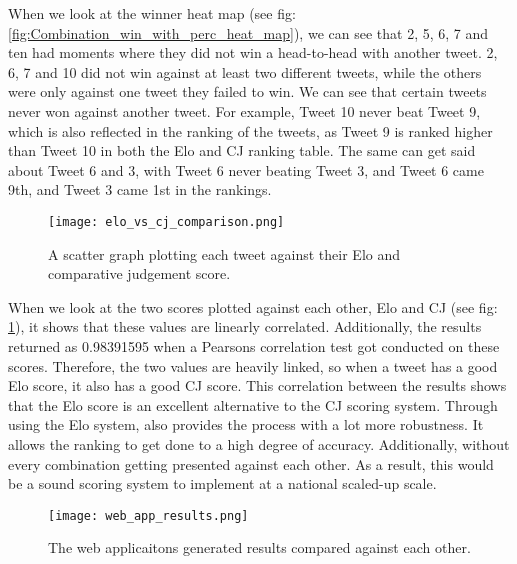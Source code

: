 	When we look at the winner heat map (see fig: \ref{fig:Combination_win_with_perc_heat_map}), we can see that 2, 5, 6, 7 and ten had moments where they did not win a head-to-head with another tweet. 2, 6, 7 and 10 did not win against at least two different tweets, while the others were only against one tweet they failed to win. We can see that certain tweets never won against another tweet. For example, Tweet 10 never beat Tweet 9, which is also reflected in the ranking of the tweets, as Tweet 9 is ranked higher than Tweet 10 in both the Elo and CJ ranking table. The same can get said about Tweet 6 and 3, with Tweet 6 never beating Tweet 3, and Tweet 6 came 9th, and Tweet 3 came 1st in the rankings.
	
	\begin{figure}[h]
		\centering
		\texttt{[image: elo\_vs\_cj\_comparison.png]}
		\caption{A scatter graph plotting each tweet against their Elo and comparative judgement score.}
		\label{fig:elo_vs_cj_comparison}
		
	\end{figure}
	
		
	


	When we look at the two scores plotted against each other, Elo and CJ (see fig: \ref{fig:elo_vs_cj_comparison}), it shows that these values are linearly correlated. Additionally, the results returned as 0.98391595 when a Pearsons correlation test got conducted on these scores. Therefore, the two values are heavily linked, so when a tweet has a good Elo score, it also has a good CJ score. This correlation between the results shows that the Elo score is an excellent alternative to the CJ scoring system. Through using the Elo system, also provides the process with a lot more robustness. It allows the ranking to get done to a high degree of accuracy. Additionally, without every combination getting presented against each other. As a result, this would be a sound scoring system to implement at a national scaled-up scale.


	\begin{figure}[h]
		\centering
		\texttt{[image: web\_app\_results.png]}
		\caption{The web applicaitons generated results compared against each other.}
		\label{fig:web_app_results}
		
	\end{figure}
	
